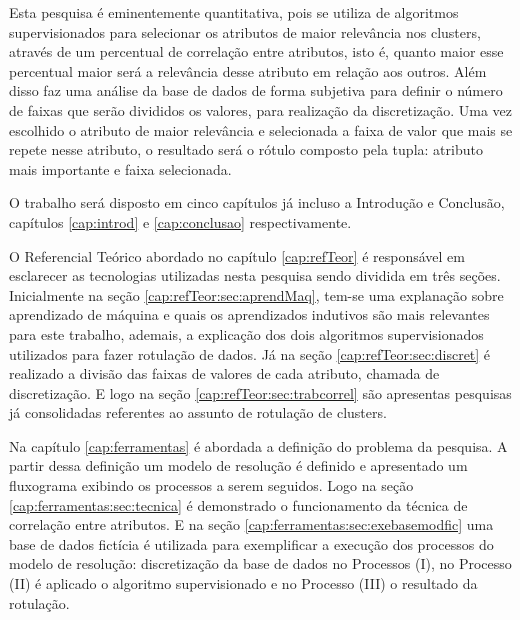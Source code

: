 Esta pesquisa é eminentemente quantitativa, pois se utiliza de algoritmos supervisionados para selecionar os atributos de maior relevância nos clusters, através de um percentual de correlação entre atributos, isto é, quanto maior esse percentual maior será a relevância desse atributo em relação aos outros. Além disso faz uma análise da base de dados de forma subjetiva para definir o número de faixas que serão divididos os valores, para realização da discretização. Uma vez escolhido o atributo de maior relevância e selecionada a faixa de valor que mais se repete nesse atributo, o resultado será o rótulo composto pela tupla: atributo mais importante e faixa selecionada. 

O trabalho será disposto em cinco capítulos já incluso  a Introdução e Conclusão, capítulos \ref{cap:introd} e \ref{cap:conclusao} respectivamente.  

O Referencial Teórico abordado no capítulo \ref{cap:refTeor} é responsável em esclarecer as tecnologias utilizadas nesta pesquisa sendo dividida em três seções. Inicialmente na seção \ref{cap:refTeor:sec:aprendMaq}, tem-se uma  explanação sobre aprendizado de máquina e quais os aprendizados indutivos são mais relevantes para este trabalho, ademais, a explicação dos dois algoritmos supervisionados utilizados para fazer rotulação de dados. Já na seção \ref{cap:refTeor:sec:discret} é realizado a divisão das faixas de valores de cada atributo, chamada de discretização. E logo na seção \ref{cap:refTeor:sec:trabcorrel} são apresentas pesquisas já consolidadas  referentes ao assunto de rotulação de clusters.

Na capítulo \ref{cap:ferramentas} é abordada a definição do problema da pesquisa. A partir dessa definição um modelo de resolução é definido e apresentado um fluxograma exibindo os processos a serem seguidos. Logo na seção \ref{cap:ferramentas:sec:tecnica} é demonstrado o funcionamento da técnica de correlação entre atributos. E na seção \ref{cap:ferramentas:sec:exebasemodfic} uma base de dados fictícia é utilizada para exemplificar a execução dos processos do modelo de resolução: discretização da base de dados no Processos (I), no Processo (II) é aplicado o algoritmo supervisionado e no Processo (III) o resultado da rotulação. 


